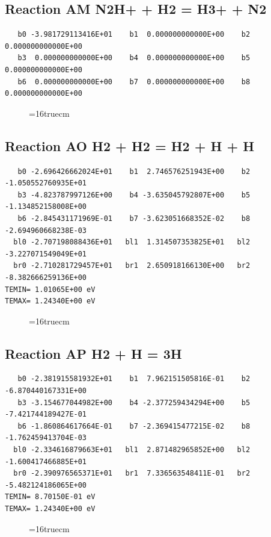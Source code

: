 \documentclass[12pt,dvipdfm]{article}
\begin{document}
\subsection{
Reaction AM N2H+ + H2 = H3+ + N2}
\begin{small}\begin{verbatim}
   b0 -3.981729113416E+01    b1  0.000000000000E+00    b2  0.000000000000E+00
   b3  0.000000000000E+00    b4  0.000000000000E+00    b5  0.000000000000E+00
   b6  0.000000000000E+00    b7  0.000000000000E+00    b8  0.000000000000E+00
   \end{verbatim}\end{small}
\begin{figure}[h!]
\label{n2rates}
\epsfxsize=16truecm
\end{figure}
\newpage

\subsection{
Reaction AO H2 + H2 = H2 + H + H }
\begin{small}\begin{verbatim}
   b0 -2.696426662024E+01    b1  2.746576251943E+00    b2 -1.050552760935E+01
   b3 -4.823787997126E+00    b4 -3.635045792807E+00    b5 -1.134852158008E+00
   b6 -2.845431171969E-01    b7 -3.623051668352E-02    b8 -2.694960668238E-03
  bl0 -2.707198088436E+01   bl1  1.314507353825E+01   bl2 -3.227071549049E+01
  br0 -2.710281729457E+01   br1  2.650918166130E+00   br2 -8.382666259136E+00
TEMIN= 1.01065E+00 eV
TEMAX= 1.24340E+00 eV
   \end{verbatim}\end{small}
\begin{figure}[h!]
\label{n2rates}
\epsfxsize=16truecm
\end{figure}
\newpage

\subsection{
Reaction AP H2 + H = 3H}
\begin{small}\begin{verbatim}
   b0 -2.381915581932E+01    b1  7.962151505816E-01    b2 -6.870440167331E+00
   b3 -3.154677044982E+00    b4 -2.377259434294E+00    b5 -7.421744189427E-01
   b6 -1.860864617664E-01    b7 -2.369415477215E-02    b8 -1.762459413704E-03
  bl0 -2.334616879663E+01   bl1  2.871482965852E+00   bl2 -1.600417466885E+01
  br0 -2.390976565371E+01   br1  7.336563548411E-01   br2 -5.482124186065E+00
TEMIN= 8.70150E-01 eV
TEMAX= 1.24340E+00 eV
   \end{verbatim}\end{small}
\begin{figure}[h!]
\label{n2rates}
\epsfxsize=16truecm
\end{figure}
\newpage
\end{document}
